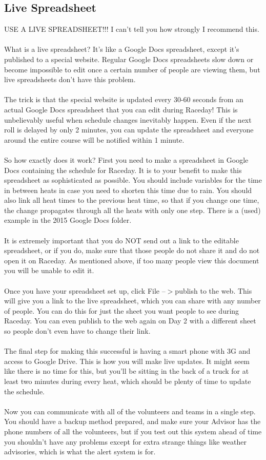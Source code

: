 \subsection{Live Spreadsheet}
USE A LIVE SPREADSHEET!!! I can't tell you how strongly I recommend this.
\\\\
What is a live spreadsheet? It's like a Google Docs spreadsheet, except it's
published to a special website. Regular Google Docs spreadsheets slow down
or become impossible to edit once a certain number of people are viewing
them, but live spreadsheets don't have this problem.
\\\\
The trick is that the special website is updated every 30-60 seconds from
an actual Google Docs spreadsheet that you can edit during Raceday! This is
unbelievably useful when schedule changes inevitably happen. Even if the
next roll is delayed by only 2 minutes, you can update the spreadsheet and
everyone around the entire course will be notified within 1 minute.
\\\\
So how exactly does it work? First you need to make a spreadsheet in Google
Docs containing the schedule for Raceday. It is to your benefit to make this
spreadsheet as sophisticated as possible. You should include variables for
the time in between heats in case you need to shorten this time due to rain.
You should also link all heat times to the previous heat time, so that if you
change one time, the change propagates through all the heats with only one
step. There is a (used) example in the 2015 Google Docs folder.
\\\\
It is extremely important that you do NOT send out a link to the editable
spreadsheet, or if you do, make sure that those people do not share it and
do not open it on Raceday. As mentioned above, if too many people view this
document you will be unable to edit it.
\\\\
Once you have your spreadsheet set up, click File --$>$publish to the web. This
will give you a link to the live spreadsheet, which you can share with any
number of people. You can do this for just the sheet you want people to see
during Raceday. You can even publish to the web again on Day 2 with a different
sheet so people don't even have to change their link.
\\\\
The final step for making this successful is having a smart phone with 3G and
access to Google Drive. This is how you will make live updates.
It might seem like there is no time for this, but you'll be sitting in the
back of a truck for at least two minutes during every heat, which should be
plenty of time to update the schedule.
\\\\
Now you can communicate with all of the volunteers and teams in a single step.
You should have a backup method prepared, and make sure your Advisor has the
phone numbers of all the volunteers, but if you test out this system ahead of
time you shouldn't have any problems except for extra strange things like
weather advisories, which is what the alert system is for.

